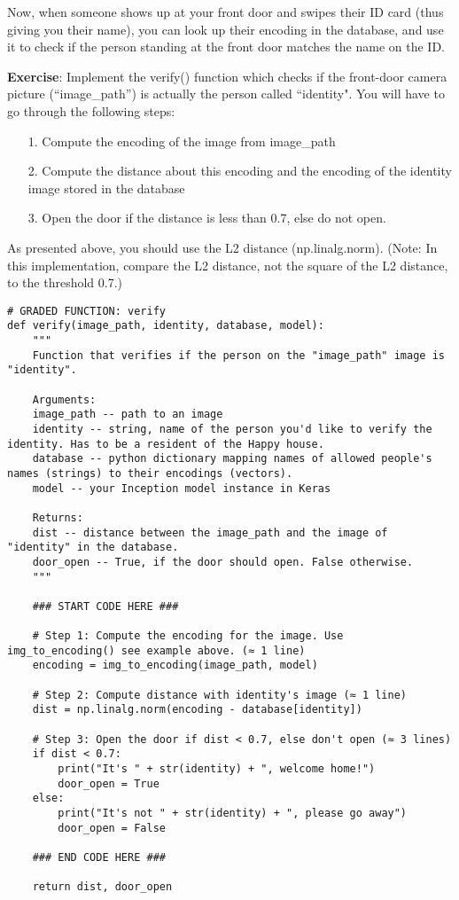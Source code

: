 Now, when someone shows up at your front door and swipes their ID card (thus giving you their name), you can look up their encoding in the database, and use it to check if the person standing at the front door matches the name on the ID.

{\textbf{Exercise}}: Implement the verify() function which checks if the front-door camera picture (``image\_path'') is actually the person called ``identity". You will have to go through the following steps:
\begin{itemize}
\item[1.] Compute the encoding of the image from image\_path
\item[2.] Compute the distance about this encoding and the encoding of the identity image stored in the database
\item[3.] Open the door if the distance is less than 0.7, else do not open.
\end{itemize}

As presented above, you should use the L2 distance (np.linalg.norm). (Note: In this implementation, compare the L2 distance, not the square of the L2 distance, to the threshold 0.7.) 
\begin{verbatim}
# GRADED FUNCTION: verify
def verify(image_path, identity, database, model):
    """
    Function that verifies if the person on the "image_path" image is "identity".
    
    Arguments:
    image_path -- path to an image
    identity -- string, name of the person you'd like to verify the identity. Has to be a resident of the Happy house.
    database -- python dictionary mapping names of allowed people's names (strings) to their encodings (vectors).
    model -- your Inception model instance in Keras
    
    Returns:
    dist -- distance between the image_path and the image of "identity" in the database.
    door_open -- True, if the door should open. False otherwise.
    """
    
    ### START CODE HERE ###
    
    # Step 1: Compute the encoding for the image. Use img_to_encoding() see example above. (≈ 1 line)
    encoding = img_to_encoding(image_path, model)
    
    # Step 2: Compute distance with identity's image (≈ 1 line)
    dist = np.linalg.norm(encoding - database[identity])
    
    # Step 3: Open the door if dist < 0.7, else don't open (≈ 3 lines)
    if dist < 0.7:
        print("It's " + str(identity) + ", welcome home!")
        door_open = True
    else:
        print("It's not " + str(identity) + ", please go away")
        door_open = False
        
    ### END CODE HERE ###
        
    return dist, door_open
\end{verbatim}

